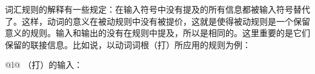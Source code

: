\noindent
词汇规则的解释有一些规定：在输入符号中没有提及的所有信息都被输入符号替代了。这样，动词的意义在被动规则中没有被提价，这就是使得被动规则是一个保留意义的规则。输入和输出的\contvs 没有在规则中提及，所以是相同的。这里重要的是它们保留的联接信息。比如说，以动词词根（打）所应用的规则为例：
\eal
\label{lr-passiv-beispiel}
\ex 
\begin{tabular}[t]{@{}l@{}}
（打）的输入：\\
\end{tabular}
\ex 
